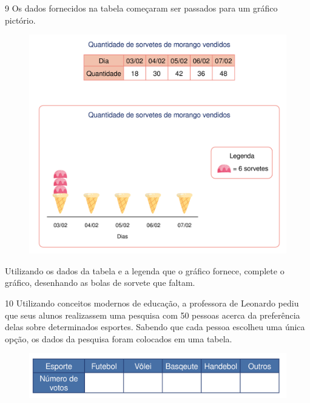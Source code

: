 \num{9} Os dados fornecidos na tabela começaram ser passados para um
gráfico pictório.\enlargethispage{3\baselineskip}

\begin{figure}[htpb!]
\centering
\includegraphics[width=.85\textwidth]{./media/image84.png}
\end{figure}

Utilizando os dados da tabela e a legenda que o gráfico fornece,
complete o gráfico, desenhando as bolas de sorvete que faltam.


\pagebreak

\num{10} Utilizando conceitos modernos de educação, a professora de Leonardo
pediu que seus alunos realizassem uma pesquisa com 50 pessoas acerca da
preferência delas sobre determinados esportes. Sabendo que cada pessoa
escolheu uma única opção, os dados da pesquisa foram colocados em uma tabela.

\begin{figure}[htpb!]
\centering
\includegraphics[width=\textwidth]{./media/image85.png}
\end{figure}

